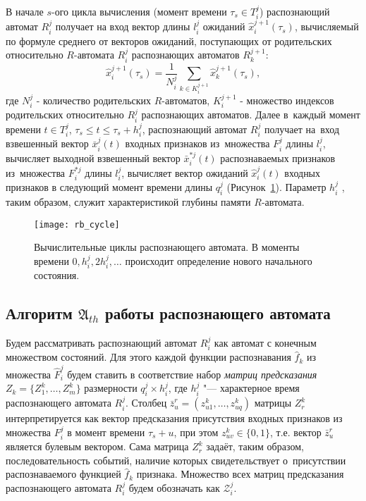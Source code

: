 В начале $s$-ого цикла вычисления (момент времени $\tau_s\in{T_i^j}$)  распознающий автомат $R_i^j$ получает на вход вектор длины $l_i^j$ ожиданий $\hat{x}_i^{j+1}(\tau_s)$, вычисляемый по формуле среднего от векторов ожиданий, поступающих от родительских относительно $R$-автомата $R_i^j$ распознающих автоматов $R_k^{j+1}$:
\begin{equation}
	\hat{x}_i^{j+1}(\tau_s)=\frac{1}{N_i^j}\sum_{k{\in}K_i^{j+1}}\hat{x}_k^{j+1}(\tau_s),
\end{equation}
где $N_i^j$ - количество родительских $R$-автоматов, $K_i^{j+1}$ - множество индексов родительских относительно $R_i^j$ распознающих автоматов. Далее в~каждый момент времени $t\in{T_i^j}$, $\tau_s\leqslant{t}\leqslant\tau_s+h_i^j$,  распознающий автомат $R_i^j$ получает на~вход взвешенный вектор $\bar{x}_i^j(t)$ входных признаков из~множества $F_i^j$ длины $l_i^j$, вычисляет выходной взвешенный вектор $\bar{x}_i^{*j}(t)$ распознаваемых признаков из~множества $F_i^{*j}$ длины $l_i^j$, вычисляет вектор ожиданий $\hat{x}_i^j(t)$ входных признаков в следующий момент времени длины $q_i^j$ (Рисунок~\ref{fig:rb_cycle}). Параметр $h_i^j$ , таким образом, служит характеристикой глубины памяти $R$-автомата.
	
\begin{figure}[h]
	\centering
	\texttt{[image: rb\_cycle]}
	\caption{Вычислительные циклы распознающего автомата. В моменты времени $0,h_i^j,2h_i^j,\dots$ происходит определение нового начального состояния.}
	\label{fig:rb_cycle}  
\end{figure}

\subsection{Алгоритм $\mathfrak A_{th}$ работы распознающего автомата}\label{subsect:rb_algorithm}

Будем рассматривать распознающий автомат $R_i^j$ как автомат с конечным множеством состояний. Для этого каждой функции распознавания $\hat{f}_k$ из множества $\hat{F}_i^j$ будем ставить в соответствие набор \textit{матриц предсказания} $Z_k=\{Z_1^k,…,Z_m^k\}$ размерности $q_i^j\times h_i^j$, где $h_i^j$ "--- характерное время распознающего автомата $R_i^j$. Столбец $\bar{z}_u^r=(z_{u1}^k,…,z_{uq}^k)$ матрицы $Z_r^k$ интерпретируется как вектор предсказания присутствия входных признаков из множества $F_i^j$ в момент времени $\tau_s+u$, при этом $z_{uv}^k\in\{0,1\}$, т.е. вектор $\bar{z}_u^r$ является булевым вектором. Сама матрица $Z_r^k$ задаёт, таким образом, последовательность событий, наличие которых свидетельствует о~присутствии распознаваемого функцией $\hat{f}_k$ признака. Множество всех матриц предсказания распознающего автомата $R_i^j$ будем обозначать как $\mathcal{Z}_i^j$.

